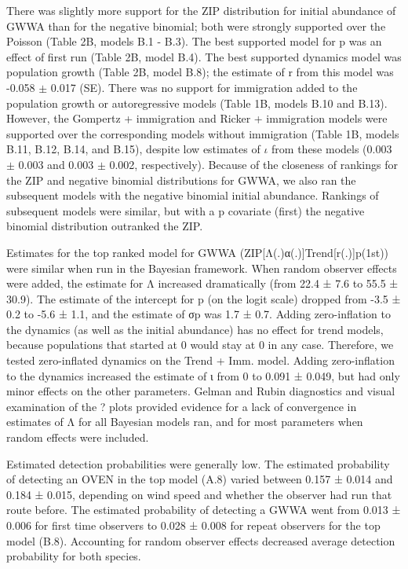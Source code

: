 \documentclass[12pt]{article}
\begin{document}
There was slightly more support for the ZIP distribution for initial
abundance of GWWA than for the negative binomial; both were strongly
supported over the Poisson (Table 2B, models B.1 - B.3).  The best
supported model for p was an effect of first run (Table 2B, model
B.4).  The best supported dynamics model was population growth (Table
2B, model B.8); the estimate of r from this model was -0.058 $\pm$ 0.017
(SE).  There was no support for immigration added to the population
growth or autoregressive models (Table 1B, models B.10 and B.13).
However, the Gompertz + immigration and Ricker + immigration models
were supported over the corresponding models without immigration
(Table 1B, models B.11, B.12, B.14, and B.15), despite low estimates
of $\iota$ from these models (0.003 $\pm$ 0.003 and 0.003 $\pm$ 0.002,
respectively).  %
Because of the closeness of rankings for the ZIP and negative binomial
distributions for GWWA, we also ran the subsequent models with the
negative binomial initial abundance.  Rankings of subsequent models
were similar, but with a p covariate (first) the negative binomial
distribution outranked the ZIP.

Estimates for the top ranked model for GWWA (ZIP[Λ(.)α(.)]Trend[r(.)]p(1st))
were similar when run in the Bayesian framework.  When random observer
effects were added, the estimate for Λ  increased dramatically
(from 22.4 ± 7.6 to 55.5 ± 30.9).  The estimate of the intercept for p (on the
logit scale) dropped from -3.5 ± 0.2 to -5.6 ± 1.1, and the estimate of σp
was 1.7 ± 0.7.  Adding zero-inflation to the dynamics (as well as the initial
abundance) has no effect for trend models, because populations that started
at 0 would stay at 0 in any case.  Therefore, we tested zero-inflated dynamics
on the Trend + Imm. model.  Adding zero-inflation to the dynamics increased
the estimate of ι from 0 to 0.091 ± 0.049, but had only minor effects on the
other parameters.  Gelman and Rubin diagnostics and visual examination of
the ? plots provided evidence for a lack of convergence in estimates of Λ
for all Bayesian models ran, and for most parameters when random effects
were included.

Estimated detection probabilities were generally low.  The estimated probability
of detecting an OVEN in the top model (A.8) varied between 0.157 ± 0.014
and 0.184 ± 0.015, depending on wind speed and whether the observer had
run that route before.  The estimated probability of detecting a GWWA went
from 0.013 ± 0.006 for first time observers to 0.028 ± 0.008 for repeat
observers for the top model (B.8).  Accounting for random observer effects
decreased average detection probability for both species.
\end{document}
